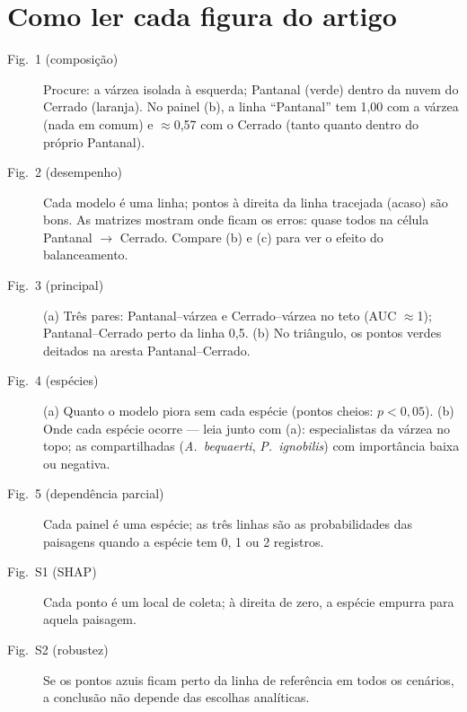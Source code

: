 \documentclass[11pt,a4paper]{article}
\newcommand{\taxon}[1]{\textit{#1}}
\begin{document}
\section{Como ler cada figura do artigo}
\begin{description}
\item[Fig.~1 (composição)] Procure: a várzea isolada à esquerda; Pantanal (verde) dentro da nuvem
do Cerrado (laranja). No painel (b), a linha ``Pantanal'' tem 1,00 com a várzea (nada em comum)
e $\approx$0,57 com o Cerrado (tanto quanto dentro do próprio Pantanal).
\item[Fig.~2 (desempenho)] Cada modelo é uma linha; pontos à direita da linha tracejada (acaso) são
bons. As matrizes mostram onde ficam os erros: quase todos na célula Pantanal $\to$ Cerrado.
Compare (b) e (c) para ver o efeito do balanceamento.
\item[Fig.~3 (principal)] (a) Três pares: Pantanal--várzea e Cerrado--várzea no teto (AUC $\approx$1);
Pantanal--Cerrado perto da linha 0,5. (b) No triângulo, os pontos verdes deitados na aresta
Pantanal--Cerrado.
\item[Fig.~4 (espécies)] (a) Quanto o modelo piora sem cada espécie (pontos cheios: $p<0{,}05$).
(b) Onde cada espécie ocorre --- leia junto com (a): especialistas da várzea no topo; as
compartilhadas (\taxon{A.~bequaerti}, \taxon{P.~ignobilis}) com importância baixa ou negativa.
\item[Fig.~5 (dependência parcial)] Cada painel é uma espécie; as três linhas são as
probabilidades das paisagens quando a espécie tem 0, 1 ou 2 registros.
\item[Fig.~S1 (SHAP)] Cada ponto é um local de coleta; à direita de zero, a espécie empurra para
aquela paisagem.
\item[Fig.~S2 (robustez)] Se os pontos azuis ficam perto da linha de referência em todos os
cenários, a conclusão não depende das escolhas analíticas.
\end{description}

\end{document}
